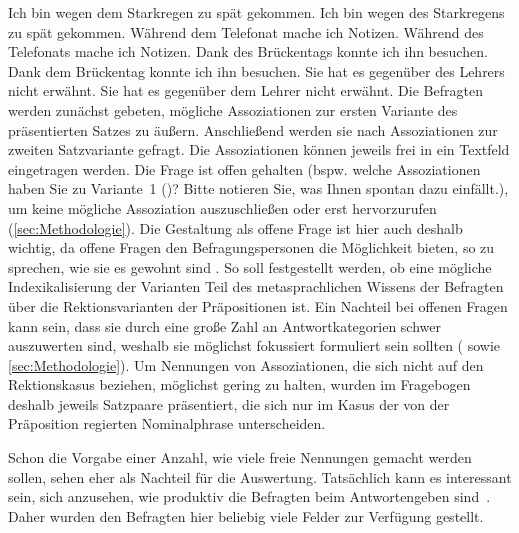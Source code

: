 \ea 
\ea  Ich bin wegen dem Starkregen zu spät gekommen.
\ex  Ich bin wegen des Starkregens zu spät gekommen.
\z 
\ex
\ea Während dem Telefonat mache ich Notizen.
\ex  Während des Telefonats mache ich Notizen.
\z 
\ex
\ea Dank des Brückentags konnte ich ihn besuchen.
\ex Dank dem Brückentag konnte ich ihn besuchen.
\z 
\ex
\ea Sie hat es gegenüber des Lehrers nicht erwähnt.
\ex Sie hat es gegenüber dem Lehrer nicht erwähnt.
\z
\z
Die Befragten werden zunächst gebeten, mögliche Assoziationen zur ersten Variante des präsentierten Satzes zu äußern. Anschließend werden sie nach Assoziationen zur zweiten Satzvariante gefragt. Die Assoziationen können jeweils frei in ein Textfeld eingetragen werden. Die Frage ist offen gehalten (bspw. \glqq welche Assoziationen haben Sie zu Variante~1 ()? Bitte notieren Sie, was Ihnen spontan dazu einfällt.\grqq), um keine mögliche Assoziation auszuschließen oder erst hervorzurufen (\autoref{sec:Methodologie}). Die Gestaltung als offene Frage ist hier auch deshalb wichtig, da offene Fragen \glqq den Befragungspersonen die Möglichkeit bieten, so zu sprechen, wie sie es gewohnt sind\grqq{} \citep[s.][739]{PorstSept.1996}. So soll festgestellt werden, ob eine mögliche Indexikalisierung der Varianten Teil des metasprachlichen Wissens der Befragten über die Rektionsvarianten der Präpositionen ist. Ein Nachteil bei offenen Fragen kann sein, dass sie durch eine große Zahl an Antwortkategorien schwer auszuwerten sind, weshalb sie möglichst fokussiert formuliert sein sollten (\citealp[s.][62--63]{Porst2014} sowie \autoref{sec:Methodologie}). Um Nennungen von Assoziationen, die sich nicht auf den Rektionskasus beziehen, möglichst gering zu halten, wurden im Fragebogen deshalb jeweils Satzpaare präsentiert, die sich nur im Kasus der von der Präposition regierten Nominalphrase unterscheiden. 

Schon die Vorgabe einer Anzahl, wie viele freie Nennungen gemacht werden sollen, sehen \citet[216]{Garrett.2004} eher als Nachteil für die Auswertung. 
Tatsächlich kann es interessant sein, sich anzusehen, wie produktiv die Befragten beim Antwortengeben sind~\citep[s.][71]{Adler.2018}. 
Daher wurden den Befragten hier beliebig viele Felder zur Verfügung gestellt. 

